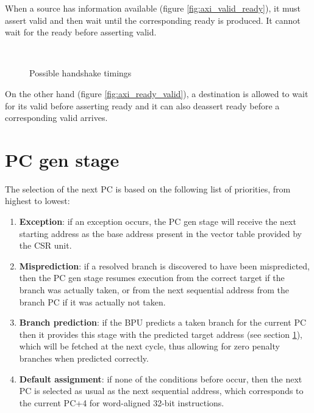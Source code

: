 When a source has information available (figure \ref{fig:axi_valid_ready}), it must assert valid and then wait until the corresponding ready is produced. It cannot wait for the ready before asserting valid.
\begin{figure}[hbt]
  \centering
   \\
  \caption{Possible handshake timings}
  \label{fig:axi_timings}
\end{figure}
On the other hand (figure \ref{fig:axi_ready_valid}), a destination is allowed to wait for its valid before asserting ready and it can also deassert ready before a corresponding valid arrives.

\section{\acs{PC} gen stage}
The selection of the next \ac{PC} is based on the following list of priorities, from highest to lowest:
\begin{enumerate}
  \item \textbf{Exception}: if an exception occurs, the \ac{PC} gen stage will receive the next starting address as the base address present in the vector table provided by the {\smaller CSR} unit.
  \item \textbf{Misprediction}: if a resolved branch is discovered to have been mispredicted, then the \ac{PC} gen stage resumes execution from the correct target if the branch was actually taken, or from the next sequential address from the branch \ac{PC} if it was actually not taken.
  \item \textbf{Branch prediction}: if the \ac{BPU} predicts a taken branch for the current \ac{PC} then it provides this stage with the predicted target address (see section \ref{}), which will be fetched at the next cycle, thus allowing for zero penalty branches when predicted correctly.
  \item \textbf{Default assignment}: if none of the conditions before occur, then the next \ac{PC} is selected as usual as the next sequential address, which corresponds to the current \ac{PC}+4 for word-aligned 32-bit instructions.
\end{enumerate}

